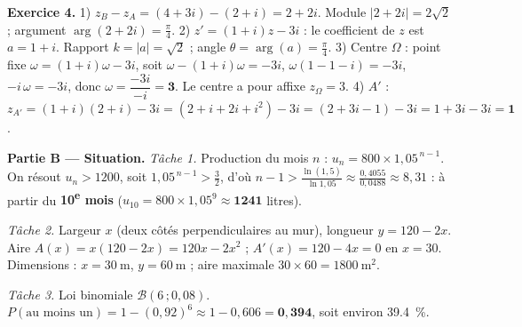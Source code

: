 \noindent\textbf{Exercice 4.}
1) $z_B-z_A=(4+3i)-(2+i)=2+2i$. Module $|2+2i|=2\sqrt2$ ;
argument $\arg(2+2i)=\frac{\pi}{4}$.
2) $z'=(1+i)z-3i$ : le coefficient de $z$ est $a=1+i$. Rapport
$k=|a|=\sqrt2$ ; angle $\theta=\arg(a)=\frac{\pi}{4}$.
3) Centre $\Omega$ : point fixe $\omega=(1+i)\omega-3i$, soit
$\omega-(1+i)\omega=-3i$, $\omega(1-1-i)=-3i$, $-i\,\omega=-3i$, donc
$\omega=\dfrac{-3i}{-i}=\mathbf{3}$. Le centre a pour affixe $z_\Omega=3$.
4) $A'$ : $z_{A'}=(1+i)(2+i)-3i=(2+i+2i+i^2)-3i=(2+3i-1)-3i=1+3i-3i=\mathbf{1}$.

\smallskip
\noindent\textbf{Partie B — Situation.}
\emph{Tâche 1.} Production du mois $n$ : $u_n=800\times1{,}05^{\,n-1}$. On résout
$u_n>1200$, soit $1{,}05^{\,n-1}>\frac{3}{2}$, d'où
$n-1>\frac{\ln(1{,}5)}{\ln1{,}05}\approx\frac{0{,}4055}{0{,}0488}\approx8{,}31$ : à partir du
\textbf{10\textsuperscript{e} mois} ($u_{10}=800\times1{,}05^9\approx\mathbf{1241}$ litres).

\emph{Tâche 2.} Largeur $x$ (deux côtés perpendiculaires au mur), longueur
$y=120-2x$. Aire $A(x)=x(120-2x)=120x-2x^2$ ; $A'(x)=120-4x=0$ en $x=30$. Dimensions :
$x=\SI{30}{\metre}$, $y=\SI{60}{\metre}$ ; aire maximale $30\times60=\SI{1800}{\metre\squared}$.

\emph{Tâche 3.} Loi binomiale $\mathcal{B}(6\,;0{,}08)$.
$P(\text{au moins un})=1-(0{,}92)^6\approx1-0{,}606=\mathbf{0{,}394}$, soit environ
\SI{39,4}{\percent}.
